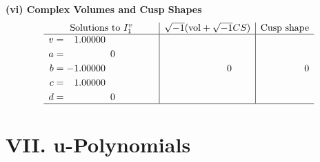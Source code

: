 \documentclass[1p]{elsarticle_modified}
\theoremstyle{definition}
\newcommand{\I}{\sqrt{-1}}
\begin{document}
\newpage\flushleft \textbf{(vi) Complex Volumes and Cusp Shapes}
$$\begin{array}{c|c|c}  
\text{Solutions to }I^v_{1}& \I (\text{vol} + \sqrt{-1}CS) & \text{Cusp shape}\\
 \hline 
\begin{aligned}
v &= \phantom{-}1.00000\phantom{ +0.000000I} \\
a &= \phantom{-0.000000 } 0 \\
b &= -1.00000\phantom{ +0.000000I} \\
c &= \phantom{-}1.00000\phantom{ +0.000000I} \\
d &= \phantom{-0.000000 } 0\end{aligned}
 & \phantom{-0.000000 } 0 & \phantom{-0.000000 } 0\\
 \hline 
 \end{array}$$\newpage
\newpage\renewcommand{\arraystretch}{1}
\centering \section*{ VII. u-Polynomials}
\end{document}
